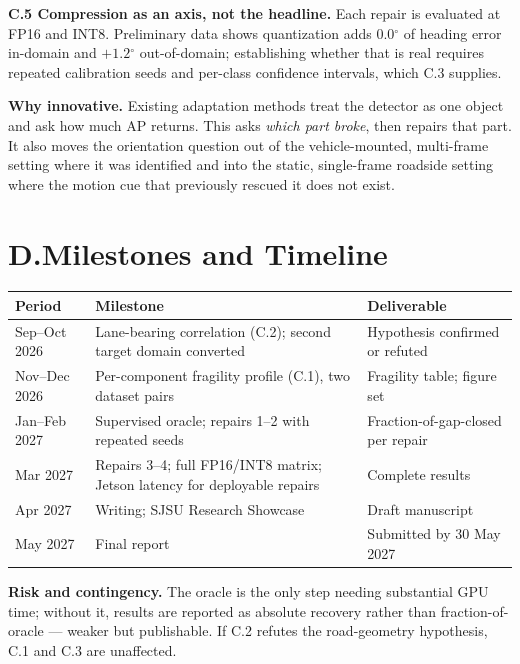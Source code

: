 \documentclass[10pt,letterpaper]{article}
\newcommand{\dg}{\ensuremath{^\circ}}
\begin{document}
\textbf{C.5 Compression as an axis, not the headline.} Each repair is evaluated at FP16 and
INT8. Preliminary data shows quantization adds $0.0\dg$ of heading error in-domain and
$+1.2\dg$ out-of-domain; establishing whether that is real requires repeated calibration seeds
and per-class confidence intervals, which C.3 supplies.

\textbf{Why innovative.} Existing adaptation methods treat the detector as one object and ask
how much AP returns. This asks \emph{which part broke}, then repairs that part. It also moves
the orientation question out of the vehicle-mounted, multi-frame setting where it was
identified and into the static, single-frame roadside setting where the motion cue that
previously rescued it does not exist.

\section{D.\quad Milestones and Timeline}

\begin{center}\small
\begin{tabular}{@{}p{}p{}p{}@{}}
\toprule
\textbf{Period} & \textbf{Milestone} & \textbf{Deliverable} \\
\midrule
Sep--Oct 2026 & Lane-bearing correlation (C.2); second target domain converted &
  Hypothesis confirmed or refuted \\
Nov--Dec 2026 & Per-component fragility profile (C.1), two dataset pairs &
  Fragility table; figure set \\
Jan--Feb 2027 & Supervised oracle; repairs 1--2 with repeated seeds &
  Fraction-of-gap-closed per repair \\
Mar 2027 & Repairs 3--4; full FP16/INT8 matrix; Jetson latency for deployable repairs &
  Complete results \\
Apr 2027 & Writing; SJSU Research Showcase & Draft manuscript \\
May 2027 & Final report & Submitted by 30 May 2027 \\
\bottomrule
\end{tabular}
\end{center}

\textbf{Risk and contingency.} The oracle is the only step needing substantial GPU time;
without it, results are reported as absolute recovery rather than fraction-of-oracle ---
weaker but publishable. If C.2 refutes the road-geometry hypothesis, C.1 and C.3 are
unaffected.
\end{document}
